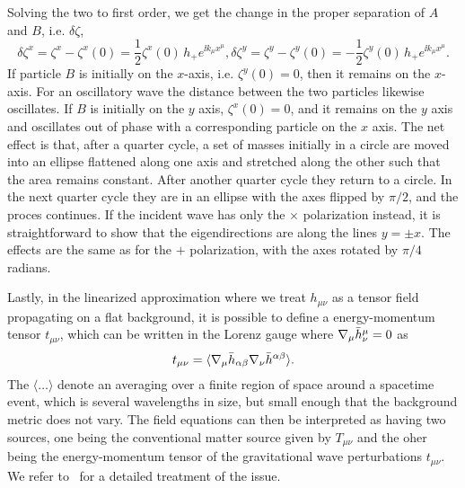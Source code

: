 Solving the two to first order, we get the change in the proper separation 
of $A$ and $B$, i.e. $\delta\zeta$,
\begin{subequations}
 \begin{equation}
  \delta\zeta^x = \zeta^x - \zeta^x(0) = \frac{1}{2}\zeta^x(0)\,h_+ e^{\ii k_\mu x^\mu},
 \end{equation}
 \begin{equation}
  \delta\zeta^y = \zeta^y - \zeta^y(0) = -\frac{1}{2}\zeta^y(0)\,h_+ e^{\ii k_\mu x^\mu}. 
 \end{equation}
\end{subequations}
If particle $B$ is initially on the $x$-axis, i.e. $\zeta^y(0) = 0$, 
then it remains on the $x$-axis.  For an oscillatory wave the
distance between the two particles likewise oscillates.  
If $B$ is initially on the $y$ axis, $\zeta^x(0) = 0$, and it remains
on the $y$ axis and oscillates out of phase with a corresponding 
particle on the $x$ axis. The net effect is that,
after a quarter cycle, a set of masses initially in a circle are moved
into an ellipse flattened along one axis and stretched along the other
such that the area remains constant.  After another quarter cycle they
return to a circle. In the next quarter cycle they are in an ellipse
with the axes flipped by $\pi /2$, and the proces continues. 
If the incident wave has only the $\times$ polarization instead, 
it is straightforward to show that the eigendirections are along
the lines $y=\pm x$.  The effects are the same as for the $+$
polarization, with the axes rotated by $\pi /4$ radians.

Lastly, in the linearized approximation where we treat $h_{\mu\nu}$ as 
a tensor field propagating on a flat background, it is possible to 
define a energy-momentum tensor $t_{\mu\nu}$, which can be written 
in the Lorenz gauge where $\nabla_\mu \bar{h}^\mu_\nu = 0$ as
\begin{equation}
 t_{\mu\nu} = \langle \nabla_\mu \bar{h}_{\alpha\beta} \nabla_\nu \bar{h}^{\alpha\beta} \rangle.
\end{equation}
The $\langle\dots\rangle$ denote an averaging over a finite region
of space around a spacetime event, which is several wavelengths in size,
but small enough that the background metric does not vary. 
The field equations can then be 
interpreted as having two sources, one being the conventional matter
source given by $T_{\mu\nu}$ and the oher being the energy-momentum
tensor of the gravitational wave perturbations $t_{\mu\nu}$. We refer 
to~\cite{mtw,RevModPhys.29.509} for a detailed treatment of the issue.


